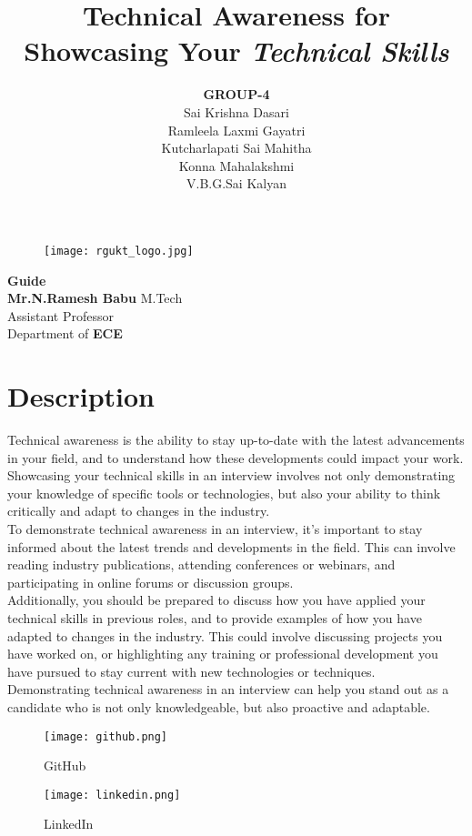 \documentclass[12pt]{article}
\title{\textbf{Technical Awareness for Showcasing Your \emph{Technical Skills}}\\}
\author{\textbf{GROUP-4}\\Sai Krishna Dasari\\Ramleela Laxmi Gayatri\\Kutcharlapati Sai Mahitha\\Konna Mahalakshmi\\V.B.G.Sai Kalyan}
\begin{document}
\maketitle %

\begin{figure}[h]
\centering
\texttt{[image: rgukt\_logo.jpg]}
\end{figure}
\begin{center}
\textbf{\textbf{Guide}}\\
\textbf{Mr.N.Ramesh Babu} M.Tech\\
Assistant Professor\\
Department of \textbf{ECE}\\
\end{center}


\pagebreak
\tableofcontents %
\clearpage

\section{Description}
Technical awareness is the ability to stay up-to-date with the latest advancements in your field, and to understand how these developments could impact your work. Showcasing your technical skills in an interview involves not only demonstrating your knowledge of specific tools or technologies, but also your ability to think critically and adapt to changes in the industry.\\

To demonstrate technical awareness in an interview, it's important to stay informed about the latest trends and developments in the field. This can involve reading industry publications, attending conferences or webinars, and participating in online forums or discussion groups.\\

Additionally, you should be prepared to discuss how you have applied your technical skills in previous roles, and to provide examples of how you have adapted to changes in the industry. This could involve discussing projects you have worked on, or highlighting any training or professional development you have pursued to stay current with new technologies or techniques.\\

Demonstrating technical awareness in an interview can help you stand out as a candidate who is not only knowledgeable, but also proactive and adaptable.

\begin{figure}[h]
\centering
\texttt{[image: github.png]}
\label{github}
\caption{GitHub}
\end{figure}
\begin{figure}[h]
\centering
\texttt{[image: linkedin.png]}
\label{linkedin}
\caption{LinkedIn}
\end{figure}
\end{document}
